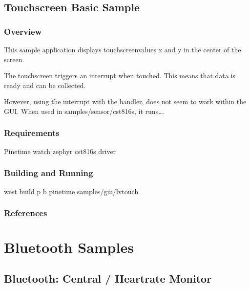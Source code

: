 \documentclass[letterpaper,10pt,english]{sphinxmanual}
\begin{document}
\subsection{Touchscreen Basic Sample}
\label{\detokenize{samples/gui/lvtouch/README:touchscreen-basic-sample}}\label{\detokenize{samples/gui/lvtouch/README:touchscreen-sample}}\label{\detokenize{samples/gui/lvtouch/README::doc}}

\subsubsection{Overview}
\label{\detokenize{samples/gui/lvtouch/README:overview}}
This sample application displays touchscreen\sphinxhyphen{}values x and y in the center of the screen.

The touchscreen triggers an interrupt when touched.
This means that data is ready and can be collected.

However, using the interrupt with the handler, does not seem to work within the GUI.
When used in samples/sensor/cst816s, it runs….


\subsubsection{Requirements}
\label{\detokenize{samples/gui/lvtouch/README:requirements}}
Pinetime watch
zephyr cst816s driver


\subsubsection{Building and Running}
\label{\detokenize{samples/gui/lvtouch/README:building-and-running}}
west build \sphinxhyphen{}p \sphinxhyphen{}b pinetime samples/gui/lvtouch


\subsubsection{References}
\label{\detokenize{samples/gui/lvtouch/README:references}}

\section{Bluetooth Samples}
\label{\detokenize{samples/bluetooth/bluetooth:bluetooth-samples}}\label{\detokenize{samples/bluetooth/bluetooth:id1}}\label{\detokenize{samples/bluetooth/bluetooth::doc}}

\subsection{Bluetooth: Central / Heart\sphinxhyphen{}rate Monitor}
\label{\detokenize{samples/bluetooth/central_hr/README:bluetooth-central-heart-rate-monitor}}\label{\detokenize{samples/bluetooth/central_hr/README:bluetooth-central-hr}}\label{\detokenize{samples/bluetooth/central_hr/README::doc}}
\end{document}
